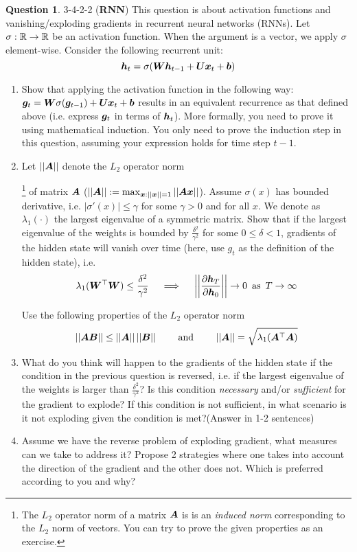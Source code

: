 \documentclass[12pt]{article}
\newif\ifsolution
\theoremstyle{definition}
\newtheorem{exercise}{Question}%
\newtheorem{answer}{Answer} %
\newcommand{\Answer}[1]{
\ifsolution\color{answer}\begin{answer}#1\end{answer}\fi
}
\newif\ifsolution
\newcommand{\staritem}{
\addtocounter{enumi}{1}
\item[$\phantom{x}^{*}$\theenumi]}
\begin{document}
\begin{exercise} 3-4-2-2 (\textbf{RNN})
    \label{ex:rnn_spectral}
    This question is about activation functions and vanishing/exploding gradients in recurrent neural networks (RNNs). Let $\sigma:\mathbb{R}\rightarrow\mathbb{R}$ be an activation function. 
    When the argument is a vector, we apply $\sigma$ element-wise. 
    Consider the following recurrent unit:
    $${\bm{h}}_t = \sigma({\bm{W}} {\bm{h}}_{t-1} + {\bm{U}}{\bm{x}}_t + {\bm{b}})$$
    \begin{enumerate}[label=\arabic{exercise}.\arabic*]
        \item Show that applying the activation function in the following way: ${\bm{g}}_t = {\bm{W}}\sigma({\bm{g}}_{t-1}) + {\bm{U}}{\bm{x}}_t + {\bm{b}}$ results  in an equivalent recurrence as that defined above (i.e. express ${\bm{g}}_t$ in terms of ${\bm{h}}_t$).
        More formally, you need to prove it using mathematical induction. 
        You only need to prove the induction step in this question, assuming your expression holds for time step $t-1$.
        \item
        Let $||{\bm{A}}||$ denote the $L_2$ operator norm
        
        \footnote{
        The $L_2$ operator norm of a matrix ${\bm{A}}$ is is an \textit{induced norm} corresponding to the $L_2$ norm of vectors. 
        You can try to prove the given properties as an exercise.
        }
        of matrix ${\bm{A}}$ ($||{\bm{A}}||:=\max_{{\bm{x}}:||{\bm{x}}||=1}||{\bm{A}}{\bm{x}}||$). 
        Assume $\sigma(x)$ has bounded derivative, i.e. $|\sigma'(x)|\leq \gamma$ for some $\gamma>0$ and for all $x$. We denote as $\lambda_1(\cdot)$ the largest eigenvalue of a symmetric matrix. Show that if the largest eigenvalue of the weights is bounded by $\frac{\delta^2}{\gamma^2}$ for some $0 \leq \delta < 1$, gradients of the hidden state will vanish over time (here, use $g_t$ as the definition of the hidden state),    
         i.e.  
        $$\lambda_1({\bm{W}}^\top{\bm{W}})\leq\frac{\delta^2}{\gamma^2} \quad\implies\quad \bigg{|}\bigg{|}\frac{\partial{\bm{h}}_T}{\partial{\bm{h}}_0}\bigg{|}\bigg{|}  \rightarrow0 \,\text{ as }\,T\rightarrow\infty$$
        
        Use the following properties of the $L_2$ operator norm 
        $$||{\bm{A}}{\bm{B}}||\leq||{\bm{A}}||\,||{\bm{B}}|| \qquad \text{ and } \qquad ||{\bm{A}}||=\sqrt{\lambda_1({\bm{A}}^\top{\bm{A}})}$$
        
        \item What do you think will happen to the gradients of the hidden state if the condition in the previous question is reversed, i.e. if the largest eigenvalue of the weights is larger than $\frac{\delta^2}{\gamma^2}$? 
        Is this condition \textit{necessary} and/or \textit{sufficient} for the gradient to explode? If this condition is not sufficient, in what scenario is it not exploding given the condition is met?(Answer in 1-2 sentences)
        \item Assume we have the reverse problem of exploding gradient, what measures can we take to address it? Propose 2 strategies where one takes into account the direction of the gradient and the other does not. Which is preferred according to you and why?
    \end{enumerate}
    \vspace{0.4cm}
    \Answer{
}
\end{exercise}
\end{document}
